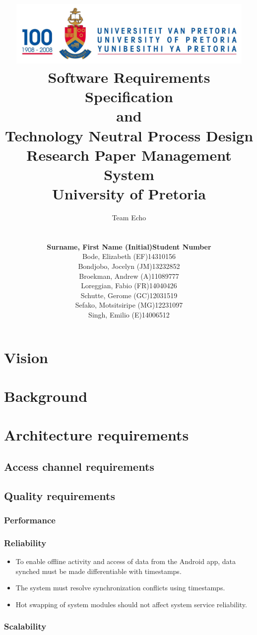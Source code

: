 \documentclass[a4paper,10pt]{article}
\title{\includegraphics[width=12cm]{Eeufeeslogo.jpg} \\
       Software Requirements Specification \\ 
       and \\
       Technology Neutral Process Design \\
       Research Paper Management System \\
       \vspace{0.5cm}
       University of Pretoria \\
       \vspace{1.0cm}
       }
\date{}
\author{Team Echo\\
	\vspace{0.5cm} \\
	\begin{tabu} to \textwidth { X[l] X[l]}
		\hline
		\textbf{Surname, First Name (Initial)}	& \textbf{Student Number}	\\ \hline \hline
		Bode, Elizabeth (EF)			& 14310156		\\ \hline
		Bondjobo, Jocelyn (JM)		& 13232852		\\ \hline
		Broekman, Andrew (A)		& 11089777		\\ \hline
		Loreggian, Fabio (FR)			& 14040426		\\ \hline
		Schutte, Gerome (GC)		& 12031519		\\ \hline
		Sefako, Motsitsiripe (MG)		& 12231097		\\ \hline
		Singh, Emilio (E)			& 14006512		\\ \hline
		\hline
	\end{tabu}}
\begin{document}
\clearpage
\maketitle
\thispagestyle{empty}

\newpage
{}

\tableofcontents

\newpage
{}

\section{Vision}

\section{Background}

\section{Architecture requirements}
\subsection{Access channel requirements}

\subsection{Quality requirements}
\subsubsection{Performance}

\subsubsection{Reliability}
\begin{itemize}
\item To enable offline activity and access of data from the Android app, data synched must be made differentiable with timestamps.
\item The system must resolve synchronization conflicts using timestamps.
\item Hot swapping of system modules should not affect system service reliability.
\end{itemize}

\subsubsection{Scalability}
\end{document}
